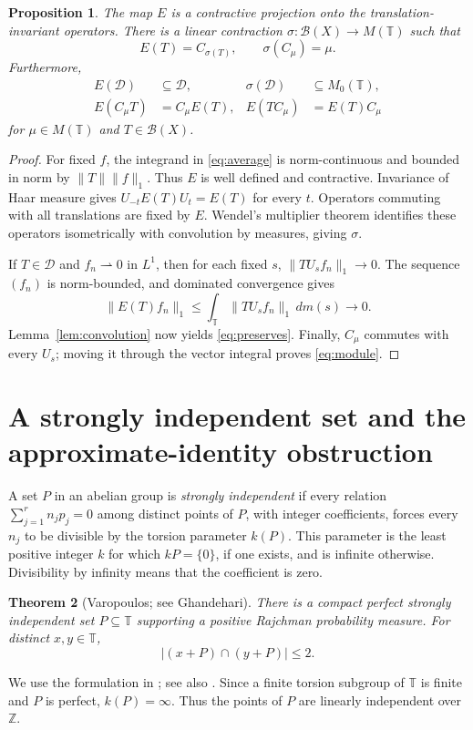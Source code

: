 \documentclass[11pt,reqno]{amsart}
\newtheorem{theorem}{Theorem}[section]
\newtheorem{proposition}[theorem]{Proposition}
\theoremstyle{definition}
\theoremstyle{remark}
\newcommand{\T}{\mathbb T}
\newcommand{\Z}{\mathbb Z}
\newcommand{\B}{\mathcal B}
\newcommand{\D}{\mathcal D}
\begin{document}
\begin{proposition}\label{prop:average}
The map $E$ is a contractive projection onto the translation-invariant operators. There is a linear contraction $\sigma:\B(X)\to M(\T)$ such that
\[
 E(T)=C_{\sigma(T)},\qquad \sigma(C_\mu)=\mu.
\]
Furthermore,
\begin{align}
 E(\D)&\subseteq\D,& \sigma(\D)&\subseteq M_0(\T),\label{eq:preserves}\\
 E(C_\mu T)&=C_\mu E(T),&E(TC_\mu)&=E(T)C_\mu \label{eq:module}
\end{align}
for $\mu\in M(\T)$ and $T\in\B(X)$.
\end{proposition}
\begin{proof}
For fixed $f$, the integrand in \eqref{eq:average} is norm-continuous and bounded in norm by $\|T\|\|f\|_1$. Thus $E$ is well defined and contractive. Invariance of Haar measure gives $U_{-t}E(T)U_t=E(T)$ for every $t$. Operators commuting with all translations are fixed by $E$. Wendel's multiplier theorem \cite{Wendel} identifies these operators isometrically with convolution by measures, giving $\sigma$.

If $T\in\D$ and $f_n\rightharpoonup0$ in $L^1$, then for each fixed $s$, $\|TU_sf_n\|_1\to0$. The sequence $(f_n)$ is norm-bounded, and dominated convergence gives
\[
 \|E(T)f_n\|_1\leq\int_\T\|TU_sf_n\|_1\,dm(s)\longrightarrow0.
\]
Lemma~\ref{lem:convolution} now yields \eqref{eq:preserves}. Finally, $C_\mu$ commutes with every $U_s$; moving it through the vector integral proves \eqref{eq:module}.
\end{proof}

\section{A strongly independent set and the approximate-identity obstruction}\label{sec:polar}

A set $P$ in an abelian group is \emph{strongly independent} if every relation $\sum_{j=1}^r n_jp_j=0$ among distinct points of $P$, with integer coefficients, forces every $n_j$ to be divisible by the torsion parameter $k(P)$. This parameter is the least positive integer $k$ for which $kP=\{0\}$, if one exists, and is infinite otherwise. Divisibility by infinity means that the coefficient is zero.

\begin{theorem}[Varopoulos; see Ghandehari]\label{thm:varopoulos}
There is a compact perfect strongly independent set $P\subseteq\T$ supporting a positive Rajchman probability measure. For distinct $x,y\in\T$,
\begin{equation}\label{eq:intersection}
 |(x+P)\cap(y+P)|\leq2.
\end{equation}
\end{theorem}
We use the formulation in \cite[Lemmas~3.1--3.2]{Gh12}; see also \cite[Lemma~2.7 and Lemma~4.1]{Gh19}. Since a finite torsion subgroup of $\T$ is finite and $P$ is perfect, $k(P)=\infty$. Thus the points of $P$ are linearly independent over $\Z$.
\end{document}
